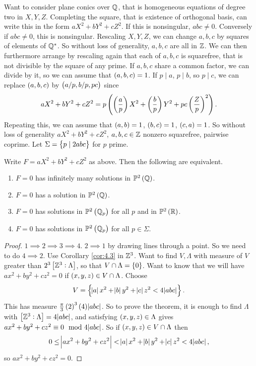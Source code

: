 Want to consider plane conics over $ \mathbb{Q} $, that is homogeneous equations of degree two in $ X, Y, Z $. Completing the square, that is existence of orthogonal basis, can write this in the form $ aX^2 + bY^2 + cZ^2 $. If this is nonsingular, $ abc \ne 0 $. Conversely if $ abc \ne 0 $, this is nonsingular. Rescaling $ X, Y, Z $, we can change $ a, b, c $ by squares of elements of $ \mathbb{Q}^* $. So without loss of generality, $ a, b, c $ are all in $ \mathbb{Z} $. We can then furthermore arrange by rescaling again that each of $ a, b, c $ is squarefree, that is not divisible by the square of any prime. If $ a, b, c $ share a common factor, we can divide by it, so we can assume that $ \br{a, b, c} = 1 $. If $ p \mid a $, $ p \mid b $, so $ p \mid c $, we can replace $ \br{a, b, c} $ by $ \br{a / p, b / p, pc} $ since
$$ aX^2 + bY^2 + cZ^2 = p\br{\br{\dfrac{a}{p}}X^2 + \br{\dfrac{b}{p}}Y^2 + pc\br{\dfrac{Z}{p}}^2}. $$
Repeating this, we can assume that $ \br{a, b} = 1 $, $ \br{b, c} = 1 $, $ \br{c, a} = 1 $. So without loss of generality $ aX^2 + bY^2 + cZ^2 $, $ a, b, c \in \mathbb{Z} $ nonzero squarefree, pairwise coprime. Let $ \Sigma = \cbr{p \mid 2abc} $ for $ p $ prime.

\begin{lemma}
Write $ F = aX^2 + bY^2 + cZ^2 $ as above. Then the following are equivalent.
\begin{enumerate}
\item $ F = 0 $ has infinitely many solutions in $ \P^2\br{\Q} $.
\item $ F = 0 $ has a solution in $ \P^2\br{\Q} $.
\item $ F = 0 $ has solutions in $ \P^2\br{\Q_p} $ for all $ p $ and in $ \P^2\br{\R} $.
\item $ F = 0 $ has solutions in $ \P^2\br{\Q_p} $ for all $ p \in \Sigma $.
\end{enumerate}
\end{lemma}

\begin{proof}
$ 1 \implies 2 \implies 3 \implies 4 $. $ 2 \implies 1 $ by drawing lines through a point. So we need to do $ 4 \implies 2 $. Use Corollary \ref{cor:4.3} in $ \mathbb{Z}^3 $. Want to find $ V, \Lambda $ with measure of $ V $ greater than $ 2^3\sbr{\Z^3 : \Lambda} $, so that $ V \cap \Lambda = \cbr{0} $. Want to know that we will have $ ax^2 + by^2 + cz^2 = 0 $ if $ \br{x, y, z} \in V \cap \Lambda $. Choose
$$ V = \cbr{\abs{a}x^2 + \abs{b}y^2 + \abs{c}z^2 < 4\abs{abc}}. $$
This has measure $ \tfrac{\pi}{3}\br{2}^3\br{4}\abs{abc} $. So to prove the theorem, it is enough to find $ \Lambda $ with $ \sbr{\Z^3 : \Lambda} = 4\abs{abc} $, and satisfying $ \br{x, y, z} \in \Lambda $ gives $ ax^2 + by^2 + cz^2 \equiv 0 \mod 4\abs{abc} $. So if $ \br{x, y, z} \in V \cap \Lambda $ then
$$ 0 \le \abs{ax^2 + by^2 + cz^2} < \abs{a}x^2 + \abs{b}y^2 + \abs{c}z^2 < 4\abs{abc}, $$
so $ ax^2 + by^2 + cz^2 = 0 $.
\end{proof}

